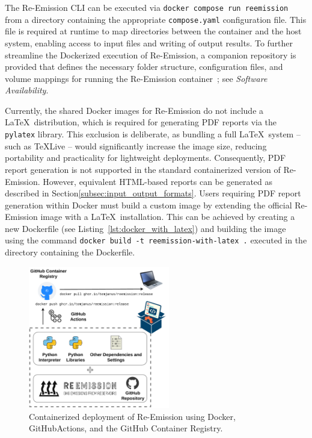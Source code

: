 \documentclass[final,1p,times]{elsarticle}
\begin{document}
The Re-Emission \ac{CLI} can be executed via \verb|docker compose run reemission| from a directory containing the appropriate \verb|compose.yaml| configuration file.
This file is required at runtime to map directories between the container and the host system, enabling access to input files and writing of output results.
To further streamline the Dockerized execution of Re-Emission, a companion repository is provided that defines the necessary folder structure, configuration files, and volume mappings for running the Re-Emission container~\cite{janus_geocaret_reemission}; see \emph{Software Availability}.

Currently, the shared Docker images for Re-Emission do not include a \LaTeX\ distribution, which is required for generating PDF reports via the \verb|pylatex| library.
This exclusion is deliberate, as bundling a full \LaTeX\ system -- such as TeXLive -- would significantly increase the image size, reducing portability and practicality for lightweight deployments.
Consequently, PDF report generation is not supported in the standard containerized version of Re-Emission.
However, equivalent HTML-based reports can be generated as described in Section\ref{subsec:input_output_formats}.
Users requiring PDF report generation within Docker must build a custom image by extending the official Re-Emission image with a \LaTeX\ installation.
This can be achieved by creating a new Dockerfile (see Listing~\ref{lst:docker_with_latex}) and building the image using the command \verb|docker build -t reemission-with-latex .| executed in the directory containing the Dockerfile.

\begin{figure}[ht]
    \centering
    \includegraphics[width=0.55\textwidth]{figures/docker-explanation.drawio.pdf}
    \caption{{Containerized deployment of Re-Emission using Docker, GitHubActions, and the GitHub Container Registry.}}
    \label{fig:docker_containerizing}
\end{figure}
\end{document}

